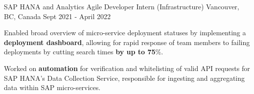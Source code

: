 
\begin{cventries}
 \cventry
    {SAP HANA and Analytics} %
    {Agile Developer Intern (Infrastructure)} %
    {Vancouver, BC, Canada} %
    {Sept 2021 - April 2022} %
    {
      \begin{cvitems} %
      \item {Enabled broad overview of micro-service deployment statuses by implementing a \textbf{deployment dashboard}, allowing for rapid response of team members to failing deployments by cutting search times\textbf{ by up to 75}\%.}
      \item {Worked on \textbf{automation} for verification and whitelisting of valid API requests for SAP HANA's Data Collection Service, responsible for ingesting and aggregating data within SAP micro-services.}

\end{cvitems}}
\end{cventries}
